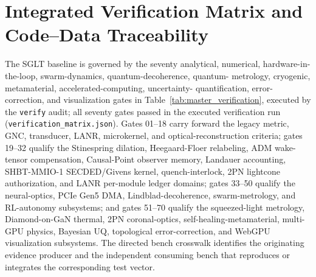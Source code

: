 \documentclass[10pt,twocolumn]{IEEEtran}
\begin{document}
\section{Integrated Verification Matrix and Code--Data Traceability}
\label{sec:verification_gate}

The SGLT baseline is governed by the seventy analytical, numerical,
hardware-in-the-loop, swarm-dynamics, quantum-decoherence, quantum-
metrology, cryogenic, metamaterial, accelerated-computing, uncertainty-
quantification, error-correction, and visualization gates in
Table~\ref{tab:master_verification}, executed by the \texttt{verify}
audit; all seventy gates passed in the executed verification run
(\texttt{verification\_matrix.json}).  Gates 01--18 carry forward the
legacy metric, GNC, transducer, LANR, microkernel, and
optical-reconstruction criteria; gates 19--32 qualify the
Stinespring dilation, Heegaard-Floer relabeling, ADM wake-tensor
compensation, Causal-Point observer memory, Landauer accounting,
SHBT-MMIO-1 SECDED/Givens kernel, quench-interlock, 2PN lightcone
authorization, and LANR per-module ledger domains; gates 33--50 qualify the neural-optics,
PCIe Gen5 DMA, Lindblad-decoherence, swarm-metrology, and RL-autonomy
subsystems; and gates 51--70 qualify the squeezed-light metrology,
Diamond-on-GaN thermal, 2PN coronal-optics, self-healing-metamaterial,
multi-GPU physics, Bayesian UQ, topological error-correction, and
WebGPU visualization subsystems.  The directed bench crosswalk
identifies the originating evidence producer and the independent
consuming bench that reproduces or integrates the corresponding test
vector.
\end{document}
